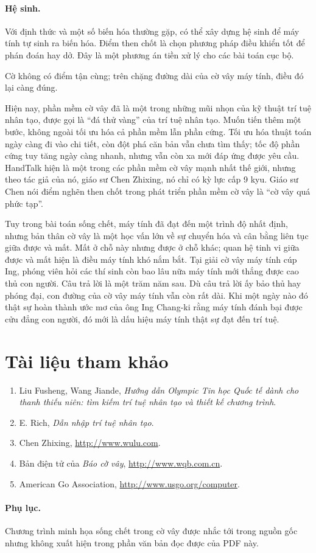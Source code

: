 \documentclass[11pt]{article}
\begin{document}
\paragraph{Hệ sinh.}
Với định thức và một số biến hóa thường gặp, có thể xây dựng hệ sinh để máy
tính tự sinh ra biến hóa. Điểm then chốt là chọn phương pháp điều khiển tốt
để phán đoán hay dở. Đây là một phương án tiền xử lý cho các bài toán cục bộ.

Cờ không có điểm tận cùng; trên chặng đường dài của cờ vây máy tính, điều đó
lại càng đúng.

Hiện nay, phần mềm cờ vây đã là một trong những mũi nhọn của kỹ thuật trí tuệ
nhân tạo, được gọi là ``đá thử vàng'' của trí tuệ nhân tạo. Muốn tiến thêm
một bước, không ngoài tối ưu hóa cả phần mềm lẫn phần cứng. Tối ưu hóa thuật
toán ngày càng đi vào chi tiết, còn đột phá căn bản vẫn chưa tìm thấy; tốc độ
phần cứng tuy tăng ngày càng nhanh, nhưng vẫn còn xa mới đáp ứng được yêu
cầu. HandTalk hiện là một trong các phần mềm cờ vây mạnh nhất thế giới, nhưng
theo tác giả của nó, giáo sư Chen Zhixing, nó chỉ có kỳ lực cấp 9 kyu. Giáo
sư Chen nói điểm nghẽn then chốt trong phát triển phần mềm cờ vây là ``cờ vây
quá phức tạp''.

Tuy trong bài toán sống chết, máy tính đã đạt đến một trình độ nhất định,
nhưng bản thân cờ vây là một học vấn lớn về sự chuyển hóa và cân bằng liên
tục giữa được và mất. Mất ở chỗ này nhưng được ở chỗ khác; quan hệ tinh vi
giữa được và mất hiện là điều máy tính khó nắm bắt. Tại giải cờ vây máy tính
cúp Ing, phóng viên hỏi các thí sinh còn bao lâu nữa máy tính mới thắng được
cao thủ con người. Câu trả lời là một trăm năm sau. Dù câu trả lời ấy bảo thủ
hay phóng đại, con đường của cờ vây máy tính vẫn còn rất dài. Khi một ngày
nào đó thật sự hoàn thành ước mơ của ông Ing Chang-ki rằng máy tính đánh bại
được cửu đẳng con người, đó mới là dấu hiệu máy tính thật sự đạt đến trí tuệ.

\section*{Tài liệu tham khảo}

\begin{enumerate}
  \item Liu Fusheng, Wang Jiande, \textit{Hướng dẫn Olympic Tin học Quốc tế
  dành cho thanh thiếu niên: tìm kiếm trí tuệ nhân tạo và thiết kế chương
  trình}.
  \item E. Rich, \textit{Dẫn nhập trí tuệ nhân tạo}.
  \item Chen Zhixing, \url{http://www.wulu.com}.
  \item Bản điện tử của \textit{Báo cờ vây}, \url{http://www.wqb.com.cn}.
  \item American Go Association, \url{http://www.usgo.org/computer}.
\end{enumerate}

\paragraph{Phụ lục.}
Chương trình minh họa sống chết trong cờ vây được nhắc tới trong nguồn gốc
nhưng không xuất hiện trong phần văn bản đọc được của PDF này.
\end{document}
